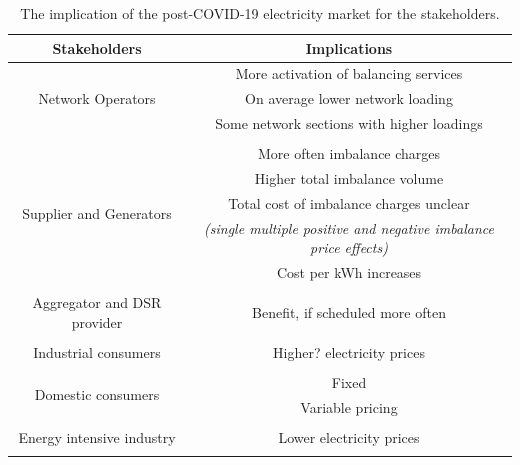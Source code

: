 \documentclass[energies,article,submit,moreauthors,pdftex]{Definitions/mdpi}
\begin{document}
\begin{table}[H]
\caption{The implication of the post-COVID-19 electricity market for the stakeholders.
}\label{table:Implications}
\centering
\begin{tabular}{cc}
\toprule
\textbf{Stakeholders} & \textbf{Implications}	\\
\midrule

\multirow{3}{10em}{Network Operators} 
& More activation of balancing services \\ 
& On average lower network loading \\ 
& Some network sections with higher loadings \\\\ 

\multirow{5}{10em}{Supplier and Generators} 
& More often imbalance charges \\ 
& Higher total imbalance volume \\ 
& Total cost of imbalance charges unclear \\
& \textit{(single multiple positive and negative imbalance price effects)} \\ 
& Cost per kWh increases \\\\

\multirow{1}{10em}{Aggregator and DSR provider} 
& Benefit, if scheduled more often \\ \\

\multirow{1}{10em}{Industrial consumers} 
& Higher? electricity prices \\\\ 


\multirow{2}{10em}{Domestic consumers} 
& Fixed \\ 
& Variable pricing \\\\ 

\multirow{1}{15em}{Energy intensive industry} 
& Lower electricity prices \\\\ 


\bottomrule
\end{tabular}
\end{table}


\end{document}
